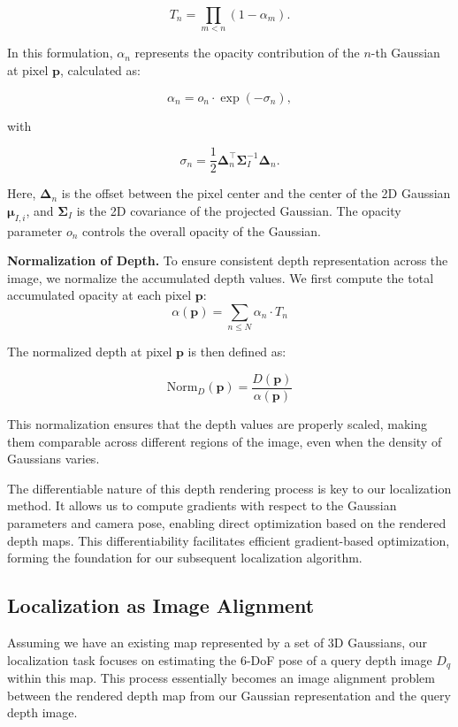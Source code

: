 \documentclass[twocolumn]{article} %
\begin{document}
\[T_n = \prod_{m < n} (1 - \alpha_m).\]

In this formulation, \(\alpha_n\) represents the opacity contribution of
the \(n\)-th Gaussian at pixel \(\mathbf{p}\), calculated as:

\[\alpha_n = o_n \cdot \exp(-\sigma_n),\]

with

\[\sigma_n = \frac{1}{2} \boldsymbol{\Delta}_n^\top \boldsymbol{\Sigma}_I^{-1} \boldsymbol{\Delta}_n.\]

Here, \(\boldsymbol{\Delta}_n\) is the offset between the pixel center
and the center of the 2D Gaussian \(\boldsymbol{\mu}_{I,i}\), and
\(\boldsymbol{\Sigma}_I\) is the 2D covariance of the projected
Gaussian. The opacity parameter \(o_n\) controls the overall opacity of
the Gaussian.

\textbf{Normalization of Depth.} To ensure consistent depth
representation across the image, we normalize the accumulated depth
values. We first compute the total accumulated opacity at each pixel
\(\mathbf{p}\): \[
\alpha(\mathbf{p}) = \sum_{n \leq N} \alpha_n \cdot T_n
\]

The normalized depth at pixel \(\mathbf{p}\) is then defined as:

\[
\text{Norm}_D(\mathbf{p}) = \frac{D(\mathbf{p})}{\alpha(\mathbf{p})}
\]

This normalization ensures that the depth values are properly scaled,
making them comparable across different regions of the image, even when
the density of Gaussians varies.

The differentiable nature of this depth rendering process is key to our
localization method. It allows us to compute gradients with respect to
the Gaussian parameters and camera pose, enabling direct optimization
based on the rendered depth maps. This differentiability facilitates
efficient gradient-based optimization, forming the foundation for our
subsequent localization algorithm.

\subsection{Localization as Image
Alignment}\label{localization-as-image-alignment}

Assuming we have an existing map represented by a set of 3D Gaussians,
our localization task focuses on estimating the 6-DoF pose of a query
depth image \(D_q\) within this map. This process essentially becomes an
image alignment problem between the rendered depth map from our Gaussian
representation and the query depth image.
\end{document}
